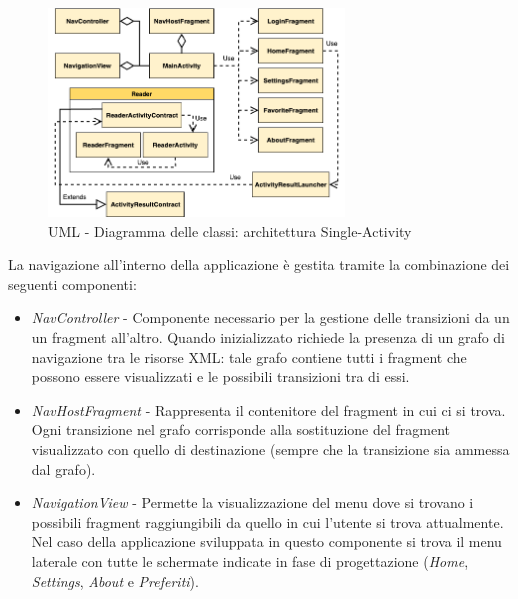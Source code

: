 \begin{figure}[H]
\centering
\includegraphics[width=0.7\textwidth]{img/tesi-27-singleactivity.drawio.png}
\caption{UML - Diagramma delle classi: architettura Single-Activity}
\label{fig:5.10}
\end{figure}

La navigazione all'interno della applicazione è gestita tramite la combinazione dei seguenti componenti:
\begin{itemize}
    \item \textit{NavController} - Componente necessario per la gestione delle transizioni da un un fragment all'altro. Quando inizializzato richiede la presenza di un grafo di navigazione tra le risorse XML: tale grafo contiene tutti i fragment che possono essere visualizzati e le possibili transizioni tra di essi.
    \item \textit{NavHostFragment} - Rappresenta il contenitore del fragment in cui ci si trova. Ogni transizione nel grafo corrisponde alla sostituzione del fragment visualizzato con quello di destinazione (sempre che la transizione sia ammessa dal grafo).
    \item \textit{NavigationView} - Permette la visualizzazione del menu dove si trovano i possibili fragment raggiungibili da quello in cui l'utente si trova attualmente. Nel caso della applicazione sviluppata in questo componente si trova il menu laterale con tutte le schermate indicate in fase di progettazione (\textit{Home}, \textit{Settings}, \textit{About} e \textit{Preferiti}).
\end{itemize}

